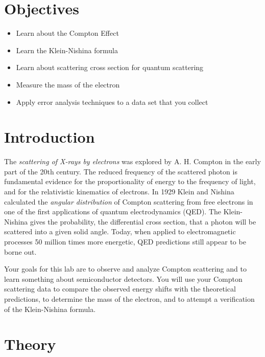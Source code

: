 \documentclass{../lab}
\begin{document}
\section{Objectives}

\begin{itemize}
    \item Learn about the Compton Effect

    \item Learn the Klein-Nishina formula

    \item Learn about scattering cross section for quantum scattering

    \item Measure the mass of the electron

    \item Apply error analysis techniques to a data set that you collect

\end{itemize}

\section{Introduction}

The \emph{scattering of X-rays by electrons }was explored by A. H. Compton in the early part of the 20th century. The reduced frequency of the scattered photon is fundamental evidence for the proportionality of energy to the frequency of light, and for the relativistic kinematics of electrons. In 1929 Klein and Nishina calculated the \emph{angular distribution} of Compton scattering from free electrons in one of the first applications of quantum electrodynamics (QED). The Klein-Nishina gives the probability, the differential cross section, that a photon will be scattered into a given solid angle. Today, when applied to electromagnetic processes 50 million times more energetic, QED predictions still appear to be borne out.

Your goals for this lab are to observe and analyze Compton scattering and to learn something about semiconductor detectors. You will use your Compton scattering data to compare the observed energy shifts with the theoretical predictions, to determine the mass of the electron, and to attempt a verification of the Klein-Nishina formula.

\section{Theory}
\end{document}

